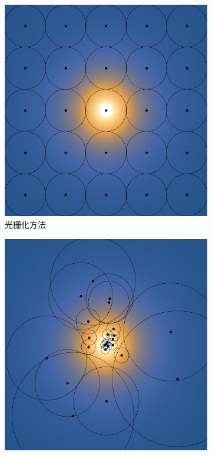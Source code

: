 \begin{figure}
\begin{fullwidth}
	\begin{subfigure}[b]{0.325\thewidth}
		\includegraphics[width=\textwidth]{figures/pl/sampling-raster}
		\caption{光栅化方法}
	\end{subfigure}
	\begin{subfigure}[b]{0.325\thewidth}
		\includegraphics[width=\textwidth]{figures/pl/sampling-importance}

\end{subfigure}
\end{fullwidth}
\end{figure}
